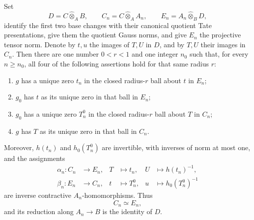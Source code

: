 \begin{lemma}
Set
\[
 D=C\widehat\otimes_AB,
 \qquad C_n=C\widehat\otimes_AA_n,
 \qquad E_n=A_n\widehat\otimes_BD,
\]
identify the first two base changes with their canonical quotient Tate
presentations, give them the quotient Gauss norms, and give \(E_n\) the
projective tensor norm. Denote by \(t,u\) the images of
\(T,U\) in \(D\), and by \(T,U\) their images in \(C_n\). Then there are
one number \(0<r<1\) and one integer \(n_0\) such that, for every
\(n\geq n_0\), all four of the following assertions hold for that same
radius \(r\):
\begin{enumerate}
\item \(g\) has a unique zero \(t_n\) in the closed radius-\(r\) ball
 about \(t\) in \(E_n\);
\item \(g_0\) has \(t\) as its unique zero in that ball in \(E_n\);
\item \(g_0\) has a unique zero \(T_n^0\) in the closed radius-\(r\) ball
 about \(T\) in \(C_n\);
\item \(g\) has \(T\) as its unique zero in that ball in \(C_n\).
\end{enumerate}
Moreover, \(h(t_n)\) and \(h_0(T_n^0)\) are invertible, with inverses of
norm at most one, and the assignments
\[
 \begin{aligned}
 \alpha_n:C_n&\longrightarrow E_n,
 &T&\longmapsto t_n,
 &U&\longmapsto h(t_n)^{-1},\\
 \beta_n:E_n&\longrightarrow C_n,
 &t&\longmapsto T_n^0,
 &u&\longmapsto h_0(T_n^0)^{-1}
 \end{aligned}
\]
are inverse contractive \(A_n\)-homomorphisms. Thus
\begin{equation}\label{eq:p061-v3-etale-tube-isomorphism}
                         C_n\simeq E_n,
\end{equation}
and its reduction along \(A_n\to B\) is the identity of \(D\).
\end{lemma}

